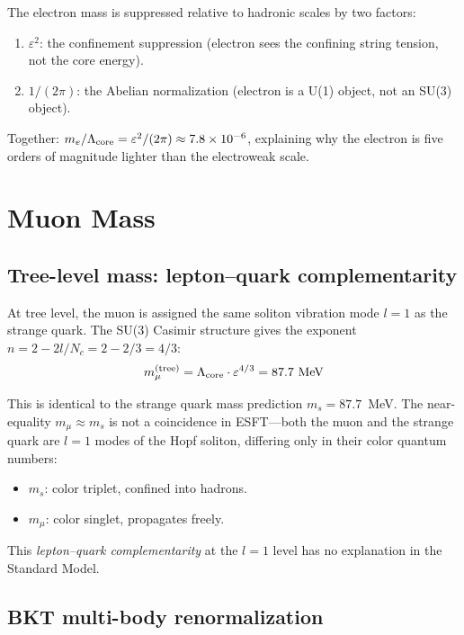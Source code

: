 ﻿\documentclass[twocolumn,preprintnumbers,amsmath,amssymb]{revtex4-2}
\begin{document}
The electron mass is suppressed relative to hadronic scales by two factors:
\begin{enumerate}
\item $\varepsilon^2$: the confinement suppression (electron sees the confining string tension, not the core energy).
\item $1/(2\pi)$: the Abelian normalization (electron is a U(1) object, not an SU(3) object).
\end{enumerate}

Together: $m_e/\Lambda_{\rm core} = \varepsilon^2/(2\pi) \approx 7.8 \times 10^{-6}$, explaining why the electron is five orders of magnitude lighter than the electroweak scale.

\section{Muon Mass}
\label{sec:muon}

\subsection{Tree-level mass: lepton--quark complementarity}

At tree level, the muon is assigned the same soliton vibration mode $l = 1$ as the strange quark. The SU(3) Casimir structure gives the exponent $n = 2 - 2l/N_c = 2 - 2/3 = 4/3$:
\begin{equation}
m_\mu^{(\rm tree)} = \Lambda_{\rm core} \cdot \varepsilon^{4/3} = 87.7~\text{MeV}
\label{eq:mu_tree}
\end{equation}

This is identical to the strange quark mass prediction $m_s = 87.7$~MeV. The near-equality $m_\mu \approx m_s$ is not a coincidence in ESFT---both the muon and the strange quark are $l = 1$ modes of the Hopf soliton, differing only in their color quantum numbers:
\begin{itemize}
\item $m_s$: color triplet, confined into hadrons.
\item $m_\mu$: color singlet, propagates freely.
\end{itemize}

This \emph{lepton--quark complementarity} at the $l = 1$ level has no explanation in the Standard Model.

\subsection{BKT multi-body renormalization}
\end{document}
